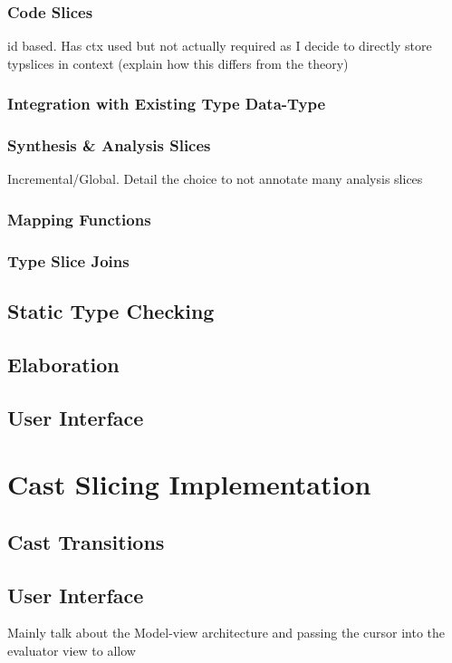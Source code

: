 \subsubsection{Code Slices}
id based. Has ctx used but not actually required as I decide to directly store typslices in context (explain how this differs from the theory)
\subsubsection{Integration with Existing Type Data-Type}
\subsubsection{Synthesis \& Analysis Slices}
Incremental/Global. Detail the choice to not annotate many analysis slices
\subsubsection{Mapping Functions}
\subsubsection{Type Slice Joins}

\subsection{Static Type Checking}


\subsection{Elaboration}


\subsection{User Interface}

\section{Cast Slicing Implementation}
\subsection{Cast Transitions}

\subsection{User Interface}
Mainly talk about the Model-view architecture and passing the cursor into the evaluator view to allow 

